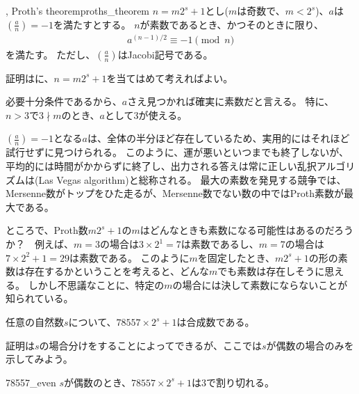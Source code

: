 \begin{Theo}{, Proth's theorem}{proths_theorem}
$n=m2^s+1$とし($m$は奇数で、$m<2^s$)、$a$は$\left(\frac{a}{n}\right)=-1$を満たすとする。
$n$が素数であるとき、かつそのときに限り、
\begin{align*}
a^{(n-1)/2} \equiv -1 \pmod{n}
\end{align*}
を満たす。
ただし、$\left(\frac{a}{n}\right)$はJacobi記号である。
\end{Theo}

証明はに、$n=m2^s+1$を当てはめて考えればよい。


必要十分条件であるから、$a$さえ見つかれば確実に素数だと言える。
特に、$n>3$で$3 \nmid m$のとき、$a$として3が使える。


$\left(\frac{a}{n}\right)=-1$となる$a$は、全体の半分ほど存在しているため、実用的にはそれほど試行せずに見つけられる。
このように、運が悪いといつまでも終了しないが、平均的には時間がかからずに終了し、出力される答えは常に正しい乱択アルゴリズムは(Las Vegas algorithm)と総称される。
最大の素数を発見する競争では、Mersenne数がトップをひた走るが、Mersenne数でない数の中ではProth素数が最大である。

ところで、Proth数$m2^s+1$の$m$はどんなときも素数になる可能性はあるのだろうか？　例えば、$m=3$の場合は$3\times2^1=7$は素数であるし、$m=7$の場合は$7\times2^2+1=29$は素数である。
このように$m$を固定したとき、$m2^s+1$の形の素数は存在するかということを考えると、どんな$m$でも素数は存在しそうに思える。
しかし不思議なことに、特定の$m$の場合には決して素数にならないことが知られている。

\begin{Theo}{}{}
任意の自然数$s$について、$78557\times 2^s+1$は合成数である。
\end{Theo}

証明は$s$の場合分けをすることによってできるが、ここでは$s$が偶数の場合のみを示してみよう。

\begin{Prop}{}{78557_even}
$s$が偶数のとき、$78557\times 2^s+1$は$3$で割り切れる。
\end{Prop}

